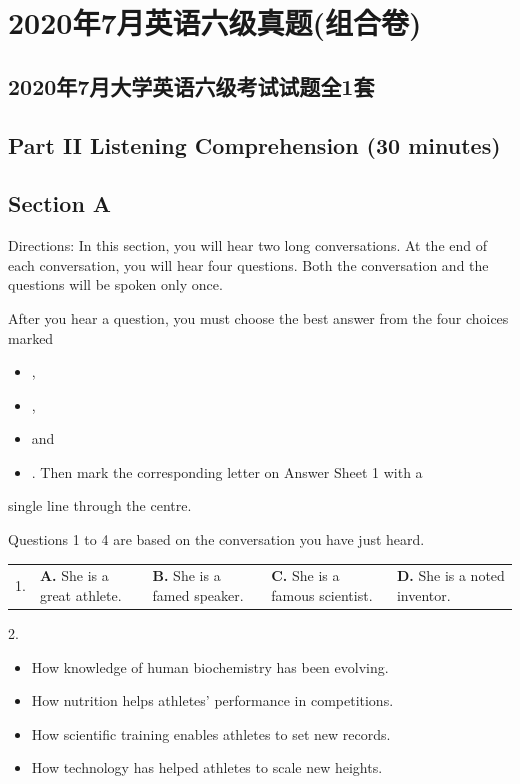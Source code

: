 \documentclass[UTF8,11pt]{ctexart}
\begin{document}
\section*{2020年7月英语六级真题(组合卷)}
\subsection*{\textbf{2020年7月大学英}语\textbf{六}级\textbf{考}试试题\textbf{全1套}}


\subsection*{Part II Listening Comprehension (30 minutes)}


\subsection*{Section A}


Directions: In this section, you will hear two long conversations. At the end of each conversation, you will hear four questions. Both the conversation and the questions will be spoken only once.


After you hear a question, you must choose the best answer from the four choices marked


\begin{itemize}[leftmargin=2em,itemsep=.2em,topsep=.4em]\item[A.] ,
\item[B.] ,
\item[C.] and
\item[D.] . Then mark the corresponding letter on Answer Sheet 1 with a
\end{itemize}

single line through the centre.


Questions 1 to 4 are based on the conversation you have just heard.


\noindent\begin{tabularx}{\linewidth}{@{}lXXXX@{}}1. & \textbf{A.} She is a great athlete. & \textbf{B.} She is a famed speaker. & \textbf{C.} She is a famous scientist. & \textbf{D.} She is a noted inventor.\\\end{tabularx}\par

2.


\begin{itemize}[leftmargin=2em,itemsep=.2em,topsep=.4em]\item[A.] How knowledge of human biochemistry has been evolving.
\item[B.] How nutrition helps athletes’ performance in competitions.
\item[C.] How scientific training enables athletes to set new records.
\item[D.] How technology has helped athletes to scale new heights.
\end{itemize}
\end{document}
